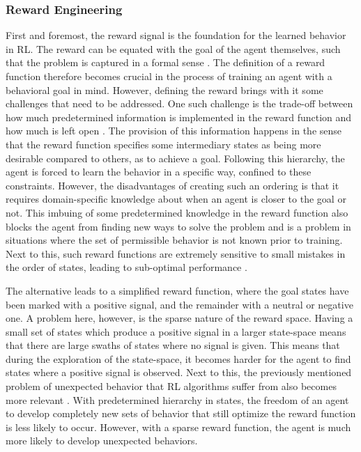 \subsubsection{Reward Engineering}
First and foremost, the reward signal is the foundation for the learned 
behavior in RL. The reward can be equated with the goal of the agent themselves, such  
that the problem is captured in a formal sense \cite{RLBook}. The definition of a reward function 
therefore becomes crucial in the process of training an agent with a 
behavioral goal in mind. However, defining the reward brings with it 
some challenges that need to be addressed. One such challenge is the trade-off 
between how much predetermined information is implemented in the reward function and 
how much is left open \cite{rewardshaping, sparserewardsarebetter}. The provision of this information 
happens in the sense 
that the reward function specifies some intermediary states as being more desirable 
compared to others, as to achieve a goal. Following this hierarchy, the agent is forced to 
learn the behavior in a specific way, confined to these constraints. 
However, the disadvantages of creating such an ordering is that it 
requires domain-specific knowledge about when an agent is closer to the goal or not. 
This imbuing of some predetermined knowledge in the reward function also blocks 
the agent from finding new ways to solve the problem and is a problem in 
situations where the set of permissible behavior is not known prior to training. 
Next to this, such reward functions are extremely sensitive to small mistakes in 
the order of states, leading to sub-optimal performance \cite{nonsparserewardissuboptimal}. 

The alternative leads to a simplified reward function, where the goal states 
have been marked with a positive signal, and the remainder with a neutral or negative one. 
A problem here, however, is the sparse nature of the reward space. Having a small 
set of states which produce a positive signal in a 
larger state-space means that there are large swaths of states where no signal 
is given. This means that during the exploration of the state-space, it becomes 
harder for the agent to find states where a positive signal is observed. 
Next to this, the previously mentioned problem of unexpected behavior that 
RL algorithms suffer from also becomes more relevant \cite{rlisweird}. With 
predetermined hierarchy in states, the freedom of an agent to develop 
completely new sets of behavior that still optimize the reward function 
is less likely to occur. However, with a sparse reward function, the agent 
is much more likely to develop unexpected behaviors.


